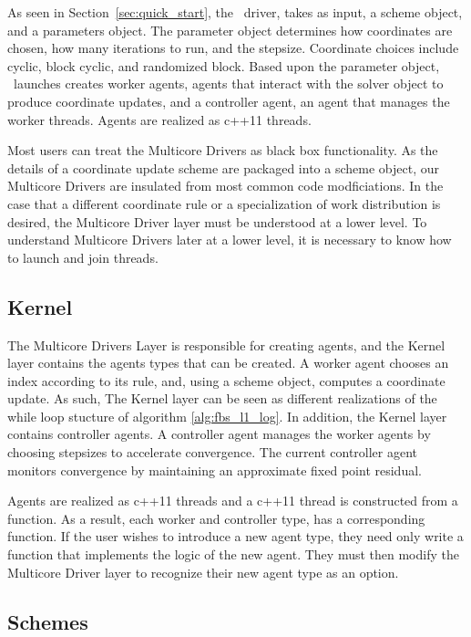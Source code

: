 As seen in Section~\ref{sec:quick_start}, the \pkg~driver, takes as input, a scheme object, and a parameters object.
The parameter object determines how coordinates are chosen, how many iterations to run, and the stepsize.
Coordinate choices include cyclic, block cyclic, and randomized block. 
Based upon the parameter object, \pkg~launches creates  worker agents, agents that interact with the solver object to produce coordinate updates, and a controller agent, an agent that manages the worker threads.
Agents are realized as c++11 threads.

Most users can treat the Multicore Drivers as black box functionality.
As the details of a coordinate update scheme are packaged into a scheme object, our Multicore Drivers are insulated from most common code modficiations.
In the case that a different coordinate rule or a specialization of work distribution is desired, the Multicore Driver layer must be understood at a lower level.
To understand  Multicore Drivers later at a lower level, it is necessary to know how to launch and join threads.


\subsection{Kernel}


The Multicore Drivers Layer is responsible for creating agents, and the Kernel layer contains the agents types that can be created.
A worker agent chooses an index according to its rule, and, using a scheme object, computes a coordinate update.
As such, The Kernel layer can be seen as different realizations of the while loop stucture of algorithm \ref{alg:fbs_l1_log}.
In addition, the Kernel layer contains controller agents.
A controller agent manages the worker agents by choosing stepsizes to accelerate convergence.
The current controller agent monitors convergence by maintaining an approximate fixed point residual.

Agents are realized as c++11 threads and a c++11 thread is constructed from a function.
As a result, each worker and controller type, has  a corresponding function.
If the user wishes to introduce a new agent type, they need only write a function that implements the logic of the new agent.
They must then modify the Multicore Driver layer to recognize their new agent type as an option.

\subsection{Schemes}

